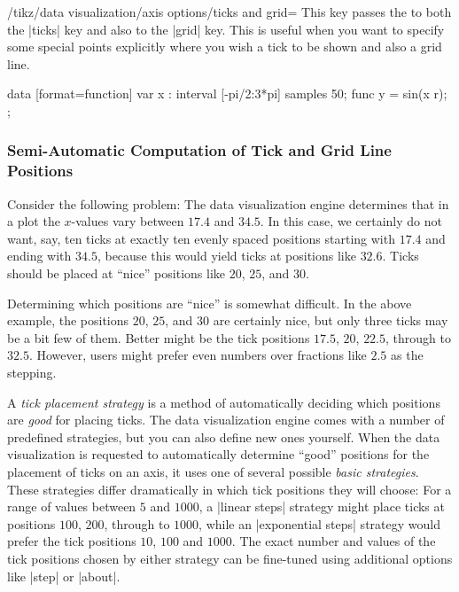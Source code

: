 \begin{key}{/tikz/data visualization/axis options/ticks and grid=}
    This key passes the  to both the |ticks| key and also to the
    |grid| key. This is useful when you want to specify some special points
    explicitly where you wish a tick to be shown and also a grid line.
\begin{codeexample}[preamble={\usetikzlibrary{datavisualization.formats.functions}}]
\tikz \datavisualization
  [scientific axes,
   visualize as smooth line,
   all axes= {grid, unit length=1.25cm},
   y axis={ ticks=few },
   x axis={ ticks=many, ticks and grid={ major also at={(pi/2) as $\frac{\pi}{2}$}}}]
  data [format=function] {
    var x : interval [-pi/2:3*pi] samples 50;
    func y = sin(\value x r);
  };
\end{codeexample}
\end{key}


\subsubsection{Semi-Automatic Computation of Tick and Grid Line Positions}
\label{section-dv-concept-tick-placement-strategies}

Consider the following problem: The data visualization engine determines that
in a plot the $x$-values vary between $17.4$ and $34.5$. In this case, we
certainly do not want, say, ten ticks at exactly ten evenly spaced positions
starting with $17.4$ and ending with $34.5$, because this would yield ticks at
positions like $32.6$. Ticks should be placed at ``nice'' positions like $20$,
$25$, and $30$.

Determining which positions are ``nice'' is somewhat difficult. In the above
example, the positions $20$, $25$, and $30$ are certainly nice, but only three
ticks may be a bit few of them. Better might be the tick positions $17.5$,
$20$, $22.5$, through to $32.5$. However, users might prefer even numbers over
fractions like $2.5$ as the stepping.

A \emph{tick placement strategy} is a method of automatically deciding which
positions are \emph{good} for placing ticks. The data visualization engine
comes with a number of predefined strategies, but you can also define new ones
yourself. When the data visualization is requested to automatically determine
``good'' positions for the placement of ticks on an axis, it uses one of
several possible \emph{basic strategies}. These strategies differ dramatically
in which tick positions they will choose: For a range of values between $5$ and
$1000$, a |linear steps| strategy might place ticks at positions $100$, $200$,
through to $1000$, while an |exponential steps| strategy would prefer the tick
positions $10$, $100$ and $1000$. The exact number and values of the tick
positions chosen by either strategy can be fine-tuned using additional options
like |step| or |about|.

